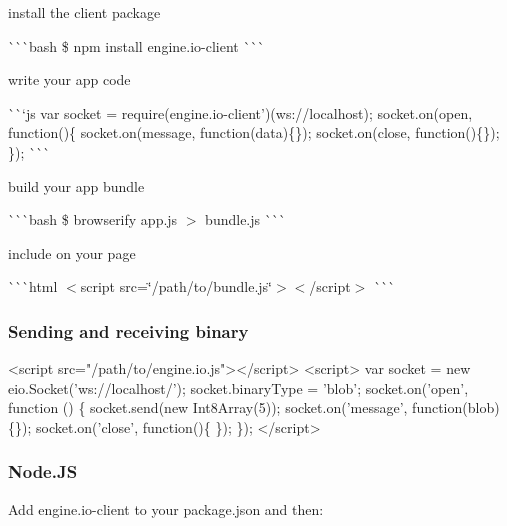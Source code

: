 \begin{DoxyEnumerate}
\item install the client package

\`{}\`{}\`{}bash \$ npm install engine.\+io-\/client \`{}\`{}\`{}
\end{DoxyEnumerate}
\begin{DoxyEnumerate}
\item write your app code

\`{}\`{}`js var socket = require(\textquotesingle{}engine.\+io-\/client')(\textquotesingle{}ws\+://localhost\textquotesingle{}); socket.\+on(\textquotesingle{}open\textquotesingle{}, function()\{ socket.\+on(\textquotesingle{}message\textquotesingle{}, function(data)\{\}); socket.\+on(\textquotesingle{}close\textquotesingle{}, function()\{\}); \}); \`{}\`{}\`{}
\end{DoxyEnumerate}
\begin{DoxyEnumerate}
\item build your app bundle

\`{}\`{}\`{}bash \$ browserify app.\+js $>$ bundle.\+js \`{}\`{}\`{}
\end{DoxyEnumerate}
\begin{DoxyEnumerate}
\item include on your page

\`{}\`{}\`{}html $<$script src=\char`\"{}/path/to/bundle.\+js\char`\"{}$>$$<$/script$>$ \`{}\`{}\`{}
\end{DoxyEnumerate}

\subsubsection*{Sending and receiving binary}


\begin{DoxyCode}
<script src="/path/to/engine.io.js"></script>
<script>
  var socket = new eio.Socket('ws://localhost/');
  socket.binaryType = 'blob';
  socket.on('open', function () \{
    socket.send(new Int8Array(5));
    socket.on('message', function(blob)\{\});
    socket.on('close', function()\{ \});
  \});
</script>
\end{DoxyCode}


\subsubsection*{Node.\+JS}

Add {\ttfamily engine.\+io-\/client} to your {\ttfamily package.\+json} and then\+:


